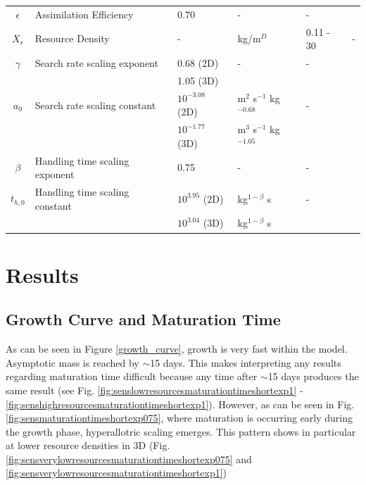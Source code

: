 \documentclass[a4paper, 11pt, hidelinks]{article} %
\begin{document}
\begin{centering}
\begin{table}[h!]
\begin{tabular}{c p{3.6cm} l l l p{3cm}}
				$\epsilon$	& Assimilation Efficiency & 0.70 & - & - 		& \cite{Peters1983} \\
				$X_r$ 		& Resource Density		& -		& kg/m$^D$		& 0.11 - 30				& -\\
				$\gamma$	& Search rate scaling exponent & 0.68 (2D)	& - & - & \cite{Pawar2012} \\
				&						& 1.05 (3D)\\
				$a_0$		& Search rate scaling constant & $10^{-3.08}$ (2D) & m$^2$ s$^{-1}$ kg$^{-0.68}$   & - &\cite{Pawar2012}	\\
				&						& $10^{-1.77}$ (3D)& m$^3$ s$^{-1}$ kg$^{-1.05} $\\
				$\beta$		& Handling time scaling exponent& 0.75 & - & - & \cite{Pawar2012}\\
				$t_{h, 0}$	& Handling time scaling constant& $10^{3.95}$ (2D) &kg$^{1-\beta}$ s& -& \cite{Pawar2012}	\\
				&						& $10^{3.04}$ (3D)			&kg$^{1-\beta}$ s\\
				\hline
			\end{tabular}
		\end{table}
	\end{centering}

	\newpage

	\nolinenumbers
\section{Results}
	\linenumbers
	

	\subsection{Growth Curve and Maturation Time}
	As can be seen in Figure \ref{growth_curve}, growth is very fast within the model.  Asymptotic mass is reached by $\sim$15 days.  This makes interpreting any results regarding maturation time difficult %
	because any time after $\sim$15 days produces the same result (see Fig. \ref{fig:senslowresourcesmaturationtimeshortexp1} - \ref{fig:senshighresourcesmaturationtimeshortexp1}).
	However, as can be seen in Fig. \ref{fig:sensmaturationtimeshortexp075}, where maturation is occurring early during the growth phase, hyperallotric scaling emerges.  This pattern shows in particular at lower resource densities in 3D (Fig. \ref{fig:sensverylowresourcesmaturationtimeshortexp075} and \ref{fig:sensverylowresourcesmaturationtimeshortexp1})
	
\end{document}
